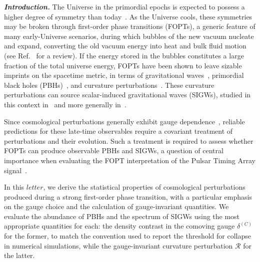 \documentclass[twocolumn,superscriptaddress,aps,preprintnumbers,amsmath,amssymb,prl,footinbib]{revtex4-2}
\begin{document}
\textit{\textbf{ Introduction.}}
{The Universe in the primordial epochs} is expected to possess a higher degree of symmetry than today~\cite{Kirzhnits:1972ut}.  As the Universe cools, these symmetries may be broken through first-order phase transitions (FOPTs), a generic feature of many early-Universe scenarios, during which bubbles of the new vacuum nucleate and expand, converting the old vacuum energy into heat and bulk fluid motion (see Ref.~\cite{Gouttenoire:2022gwi} for a review).
If the energy stored in the bubbles constitutes a large fraction of the total universe energy, {FOPTs have been shown to} leave sizable imprints on the spacetime metric, in terms of gravitational waves~\cite{Caprini:2015zlo,Caprini:2019egz}, primordial black holes (PBHs)~\cite{Kodama:1982sf,Hsu:1990fg,Liu:2021svg,Hashino:2021qoq,Jung:2021mku,Kawana:2022olo,Lewicki:2023ioy,Gouttenoire:2023naa,Baldes:2023rqv,Gouttenoire:2023bqy,Salvio:2023ynn,Gouttenoire:2023pxh,Jinno:2023vnr,Banerjee:2023qya,Flores:2024lng,Lewicki:2024ghw,Lewicki:2024sfw,Ai:2024cka,Conaci:2024tlc,Kanemura:2024pae,Banerjee:2024cwv,Hashino:2025fse,Murai:2025hse,Zou:2025sow,Ghoshal:2025dmi,Byrnes:2025tji}, and curvature perturbations~\cite{Sasaki:1982fi,Liu:2022lvz,Giombi:2023jqq,Elor:2023xbz,Lewicki:2024ghw,Buckley:2024nen,Cai:2024nln,Jinno:2024nwb}. {These curvature perturbations can source scalar-induced gravitational waves (SIGWs), studied in this context in~\cite{Lewicki:2024ghw} and more generally in~\cite{Tomita:1975kj,Matarrese:1992rp,Matarrese:1993zf,Matarrese:1997ay,Acquaviva:2002ud,Mollerach:2003nq,Carbone:2004iv,Ananda:2006af,Baumann:2007zm,Espinosa:2018eve,Kohri:2018awv,Domenech:2021ztg}.}

Since cosmological perturbations generally exhibit gauge dependence~\cite{Bardeen:1980kt}, reliable predictions for these late-time observables require a covariant treatment of perturbations and their evolution. {Such a treatment is required to assess whether FOPTs can produce observable PBHs and SIGWs, a question of central importance when evaluating the FOPT interpretation of the Pulsar Timing Array signal~\cite{Gouttenoire:2023bqy,Ellis:2023oxs,Lewicki:2024ghw}.}

In this $\textit{letter}$, we derive the statistical properties of cosmological perturbations produced during a strong first-order phase transition, with a particular emphasis on the gauge choice and the calculation of gauge-invariant quantities.
We evaluate the abundance of PBHs and the spectrum of SIGWs using the most appropriate quantities for each: the density contrast in the comoving gauge $\delta^{(C)}$ for the former, to match the convention used to report the threshold for collapse in numerical simulations, while the gauge-invariant curvature perturbation $\mathcal{R}$ for the latter.
\end{document}
